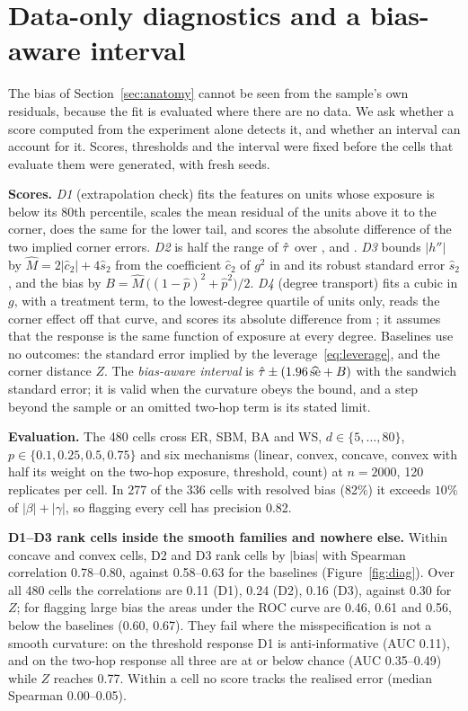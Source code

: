 \section{Data-only diagnostics and a bias-aware interval}\label{sec:diagnostic}
The bias of Section~\ref{sec:anatomy} cannot be seen from the sample's own residuals, because the fit is evaluated where there are no data. We ask whether a score computed from the experiment alone detects it, and whether an interval can account for it. Scores, thresholds and the interval were fixed before the cells that evaluate them were generated, with fresh seeds.

\textbf{Scores.} \emph{D1} (extrapolation check) fits the features on units whose exposure is below its 80th percentile, scales the mean residual of the units above it to the corner, does the same for the lower tail, and scores the absolute difference of the two implied corner errors.
\emph{D2} is half the range of $\hat\tau$ over ,  and .
\emph{D3} bounds $|h''|$ by $\hat M=2|\hat c_2|+4\hat s_2$ from the coefficient $\hat c_2$ of $g^2$ in  and its robust standard error $\hat s_2$, and the bias by $B=\hat M\,\bigl((1-\hat p)^2+\hat p^2\bigr)/2$.
\emph{D4} (degree transport) fits a cubic in $g$, with a treatment term, to the lowest-degree quartile of units only, reads the corner effect off that curve, and scores its absolute difference from ; it assumes that the response is the same function of exposure at every degree.
Baselines use no outcomes: the standard error implied by the leverage~\eqref{eq:leverage}, and the corner distance $Z$.
The \emph{bias-aware interval} is $\hat\tau\pm(1.96\,\widehat{\mathrm{se}}+B)$ with the sandwich standard error; it is valid when the curvature obeys the bound, and a step beyond the sample or an omitted two-hop term is its stated limit.

\textbf{Evaluation.} The 480 cells cross ER, SBM, BA and WS, $d\in\{5,\dots,80\}$, $p\in\{0.1,0.25,0.5,0.75\}$ and six mechanisms (linear, convex, concave, convex with half its weight on the two-hop exposure, threshold, count) at $n=2000$, 120 replicates per cell. In 277 of the 336 cells with resolved bias (82\%) it exceeds $10\%$ of $|\beta|+|\gamma|$, so flagging every cell has precision 0.82.

\textbf{D1--D3 rank cells inside the smooth families and nowhere else.}
Within concave and convex cells, D2 and D3 rank cells by $|\text{bias}|$ with Spearman correlation 0.78--0.80, against 0.58--0.63 for the baselines (Figure~\ref{fig:diag}). Over all 480 cells the correlations are 0.11 (D1), 0.24 (D2), 0.16 (D3), against 0.30 for $Z$; for flagging large bias the areas under the ROC curve are 0.46, 0.61 and 0.56, below the baselines (0.60, 0.67).
They fail where the misspecification is not a smooth curvature: on the threshold response D1 is anti-informative (AUC 0.11), and on the two-hop response all three are at or below chance (AUC 0.35--0.49) while $Z$ reaches 0.77. Within a cell no score tracks the realised error (median Spearman 0.00--0.05).

